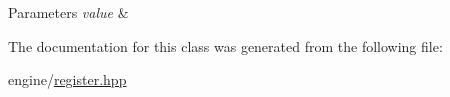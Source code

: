 \begin{DoxyParams}{Parameters}
{\em value} & \\
\hline
\end{DoxyParams}


The documentation for this class was generated from the following file\+:\begin{DoxyCompactItemize}
\item 
engine/\hyperlink{register_8hpp}{register.\+hpp}\end{DoxyCompactItemize}
